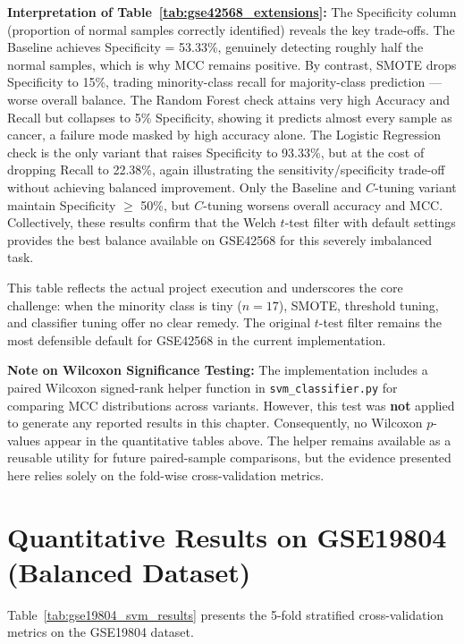\medskip

\textbf{\textsf{Interpretation of Table~\ref{tab:gse42568_extensions}:}} The Specificity column (proportion of normal samples correctly identified) reveals the key trade-offs. The Baseline achieves Specificity = 53.33\%, genuinely detecting roughly half the normal samples, which is why MCC remains positive. By contrast, SMOTE drops Specificity to 15\%, trading minority-class recall for majority-class prediction — worse overall balance. The Random Forest check attains very high Accuracy and Recall but collapses to 5\% Specificity, showing it predicts almost every sample as cancer, a failure mode masked by high accuracy alone. The Logistic Regression check is the only variant that raises Specificity to 93.33\%, but at the cost of dropping Recall to 22.38\%, again illustrating the sensitivity/specificity trade-off without achieving balanced improvement. Only the Baseline and $C$-tuning variant maintain Specificity $\ge$ 50\%, but $C$-tuning worsens overall accuracy and MCC. Collectively, these results confirm that the Welch $t$-test filter with default settings provides the best balance available on GSE42568 for this severely imbalanced task.

This table reflects the actual project execution and underscores the core challenge: when the minority class is tiny ($n=17$), SMOTE, threshold tuning, and classifier tuning offer no clear remedy. The original $t$-test filter remains the most defensible default for GSE42568 in the current implementation.

\medskip

\textbf{\textsf{Note on Wilcoxon Significance Testing:}} The implementation includes a paired Wilcoxon signed-rank helper function in \texttt{svm\_classifier.py} for comparing MCC distributions across variants. However, this test was \textbf{not} applied to generate any reported results in this chapter. Consequently, no Wilcoxon $p$-values appear in the quantitative tables above. The helper remains available as a reusable utility for future paired-sample comparisons, but the evidence presented here relies solely on the fold-wise cross-validation metrics.

\section{Quantitative Results on GSE19804 (Balanced Dataset)}

Table~\ref{tab:gse19804_svm_results} presents the 5-fold stratified cross-validation metrics on the GSE19804 dataset.

